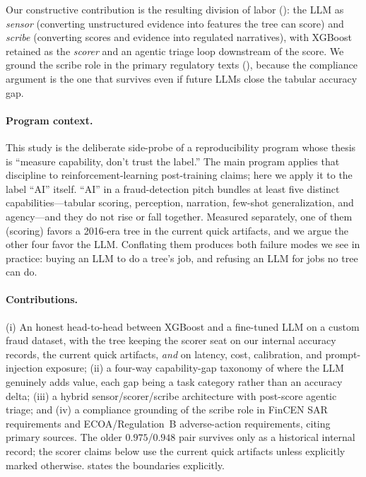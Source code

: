 Our constructive contribution is the resulting division of labor
(): the LLM as \emph{sensor} (converting
unstructured evidence into features the tree can score) and \emph{scribe}
(converting scores and evidence into regulated narratives), with XGBoost
retained as the \emph{scorer} and an agentic triage loop downstream of the
score. We ground the scribe role in the primary regulatory texts
(), because the compliance argument is the one that
survives even if future LLMs close the tabular accuracy gap.

\paragraph{Program context.} This study is the deliberate side-probe of a
reproducibility program whose thesis is ``measure capability, don't trust the
label.'' The main program applies that discipline to reinforcement-learning
post-training claims; here we apply it to the label ``AI'' itself. ``AI'' in a
fraud-detection pitch bundles at least five distinct capabilities---tabular
scoring, perception, narration, few-shot generalization, and agency---and they
do not rise or fall together. Measured separately, one of them (scoring)
favors a 2016-era tree in the current quick artifacts, and we argue the other four
favor the LLM. Conflating them produces both failure
modes we see in practice: buying an LLM to do a tree's job, and refusing an LLM
for jobs no tree can do.

\paragraph{Contributions.}
(i) An honest head-to-head between XGBoost and a fine-tuned LLM on a custom
fraud dataset, with the tree keeping the scorer seat on our internal accuracy
records, the current quick artifacts, \emph{and} on
latency, cost, calibration, and prompt-injection exposure;
(ii) a four-way capability-gap taxonomy of where the LLM genuinely adds value,
each gap being a task category rather than an accuracy delta;
(iii) a hybrid sensor/scorer/scribe architecture with post-score agentic
triage; and
(iv) a compliance grounding of the scribe role in FinCEN SAR requirements and
ECOA/Regulation~B adverse-action requirements, citing primary sources.
The older $0.975$/$0.948$ pair survives only as a historical internal record;
the scorer claims below use the current quick artifacts unless explicitly
marked otherwise.  states the boundaries
explicitly.
